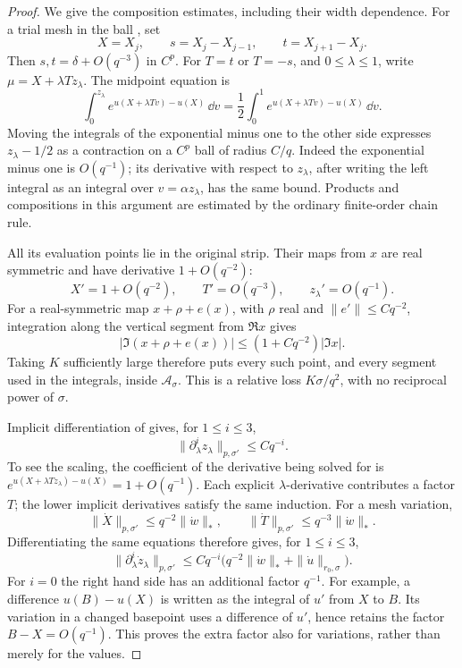 \begin{proof}
We give the composition estimates, including their width dependence.
For a trial mesh in the ball , set
\[
X=X_j,\qquad s=X_j-X_{j-1},\qquad t=X_{j+1}-X_j.
\]
Then \(s,t=\delta+O(q^{-3})\) in \(C^p\).
For \(T=t\) or \(T=-s\), and \(0\le\lambda\le1\), write
\(\mu=X+\lambda T z_\lambda\).  The midpoint equation is
\begin{equation}\label{ana:midpoint-equation}
\int_0^{z_\lambda}
 e^{u(X+\lambda Tv)-u(X)}\,\dd v
=\frac12\int_0^1e^{u(X+\lambda Tv)-u(X)}\,\dd v .
\end{equation}
Moving the integrals of the exponential minus one to the other side
expresses \(z_\lambda-1/2\) as a contraction on a \(C^p\) ball of
radius \(C/q\).  Indeed the exponential minus one is \(O(q^{-1})\);
its derivative with respect to \(z_\lambda\), after writing the
left integral as an integral over \(v=\alpha z_\lambda\), has the
same bound.  Products and compositions in this argument are estimated
by the ordinary finite-order chain rule.

All its evaluation points lie in the original strip.  Their maps from
\(x\) are real symmetric and have derivative \(1+O(q^{-2})\):
\[
X'=1+O(q^{-2}),\qquad T'=O(q^{-3}),\qquad
z_\lambda'=O(q^{-1}).
\]
For a real-symmetric map \(x+\rho+e(x)\), with \(\rho\) real and
\(\|e'\|\le Cq^{-2}\), integration along the vertical segment from
\(\Re x\) gives
\[
|\Im(x+\rho+e(x))|\le(1+Cq^{-2})|\Im x|.
\]
Taking \(K\) sufficiently large therefore puts every such point,
and every segment used in the integrals, inside \(\mathcal A_\sigma\).
This is a relative loss \(K\sigma/q^2\), with no reciprocal power of
\(\sigma\).

Implicit differentiation of  gives, for
\(1\le i\le3\),
\begin{equation}\label{ana:midpoint-jets}
\|\partial_\lambda^i z_\lambda\|_{p,\sigma'}\le Cq^{-i}.
\end{equation}
To see the scaling, the coefficient of the derivative being solved
for is \(e^{u(X+\lambda Tz_\lambda)-u(X)}=1+O(q^{-1})\).
Each explicit \(\lambda\)-derivative contributes a factor \(T\);
the lower implicit derivatives satisfy the same induction.
For a mesh variation,
\[
\|\dot X\|_{p,\sigma'}\le q^{-2}\|\dot w\|_*,
\qquad
\|\dot T\|_{p,\sigma'}\le q^{-3}\|\dot w\|_*.
\]
Differentiating the same equations therefore gives, for \(1\le i\le3\),
\begin{equation}\label{ana:midpoint-variation}
\|\partial_\lambda^i\dot z_\lambda\|_{p,\sigma'}
\le Cq^{-i}
 \bigl(q^{-2}\|\dot w\|_*+\|\dot u\|_{r_0,\sigma}\bigr).
\end{equation}
For \(i=0\) the right hand side has an additional factor \(q^{-1}\).
For example, a difference \(u(B)-u(X)\) is written as the integral
of \(u'\) from \(X\) to \(B\).  Its variation in a changed basepoint
uses a difference of \(u'\), hence retains the factor \(B-X=O(q^{-1})\).
This proves the extra factor also for variations, rather than merely
for the values.


\end{proof}

